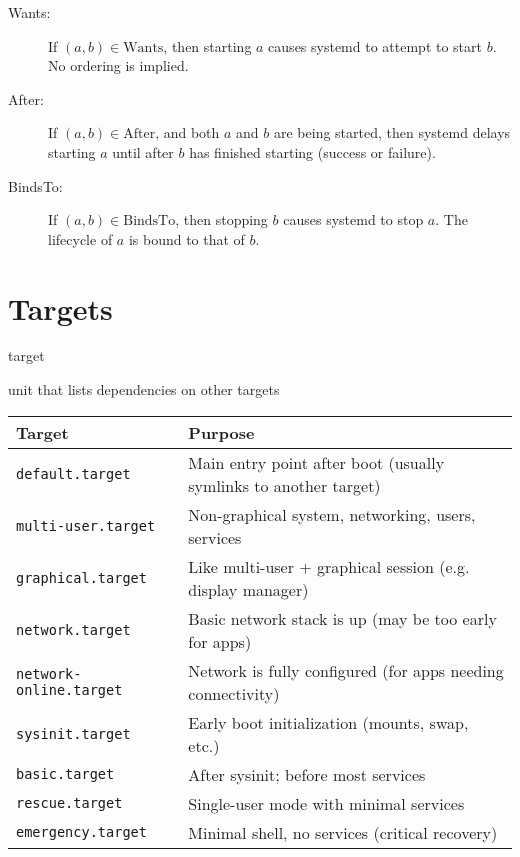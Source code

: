 \documentclass[openany, 12pt]{book}
\begin{document}
\begin{description}
  \item[Wants:] If $(a, b) \in \text{Wants}$, then starting $a$ causes systemd
        to attempt to start $b$. No ordering is implied.

  \item[After:] If $(a, b) \in \text{After}$, and both $a$ and $b$ are being
        started, then systemd delays starting $a$ until after $b$ has finished
        starting (success or failure).

  \item[BindsTo:] If $(a, b) \in \text{BindsTo}$, then stopping $b$ causes
        systemd to stop $a$. The lifecycle of $a$ is bound to that of $b$.
\end{description}


\chapter{Targets}

\begin{definition}{target}{}
  \begin{alist}
    \item unit that lists dependencies on other targets
  \end{alist}
\end{definition}

\begin{tabular}{@{}ll@{}}
  \toprule
  \textbf{Target}                & \textbf{Purpose}                                                 \\
  \midrule
  \texttt{default.target}        & Main entry point after boot (usually symlinks to another target) \\
  \texttt{multi-user.target}     & Non-graphical system, networking, users, services                \\
  \texttt{graphical.target}      & Like multi-user + graphical session (e.g. display manager)       \\
  \texttt{network.target}        & Basic network stack is up (may be too early for apps)            \\
  \texttt{network-online.target} & Network is fully configured (for apps needing connectivity)      \\
  \texttt{sysinit.target}        & Early boot initialization (mounts, swap, etc.)                   \\
  \texttt{basic.target}          & After sysinit; before most services                              \\
  \texttt{rescue.target}         & Single-user mode with minimal services                           \\
  \texttt{emergency.target}      & Minimal shell, no services (critical recovery)                   \\
  \bottomrule
\end{tabular}
\end{document}
